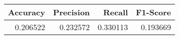 \begin{tabular}{rrrr}
\toprule
 Accuracy &  Precision &   Recall &  F1-Score \\
\midrule
 0.206522 &   0.232572 & 0.330113 &  0.193669 \\
\bottomrule
\end{tabular}
